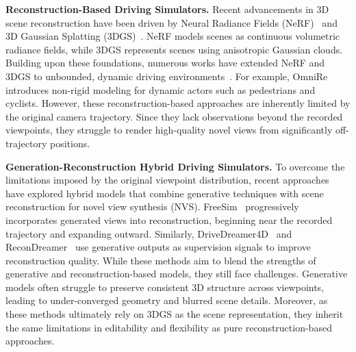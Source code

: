 
 

\textbf{Reconstruction-Based Driving Simulators.}  
Recent advancements in 3D scene reconstruction have been driven by Neural Radiance Fields (NeRF)~\cite{mildenhall2020nerf} and 3D Gaussian Splatting (3DGS)~\cite{kerbl20233d}. NeRF models scenes as continuous volumetric radiance fields, while 3DGS represents scenes using anisotropic Gaussian clouds. Building upon these foundations, numerous works have extended NeRF and 3DGS to unbounded, dynamic driving environments~\cite{chen2023periodic,huang2024s3gaussian,wu2023mars,guo2023streetsurf,turki2023suds,yang2023unisim,tonderski2024neurad,zhou2024drivinggaussian,yan2024street}. For example, OmniRe~\cite{chen2025omnire} introduces non-rigid modeling for dynamic actors such as pedestrians and cyclists. However, these reconstruction-based approaches are inherently limited by the original camera trajectory. Since they lack observations beyond the recorded viewpoints, they struggle to render high-quality novel views from significantly off-trajectory positions.

\textbf{Generation-Reconstruction Hybrid Driving Simulators.}  
To overcome the limitations imposed by the original viewpoint distribution, recent approaches have explored hybrid models that combine generative techniques with scene reconstruction for novel view synthesis (NVS). FreeSim~\cite{fan2024freesim} progressively incorporates generated views into reconstruction, beginning near the recorded trajectory and expanding outward. Similarly, DriveDreamer4D~\cite{zhao2024drive} and ReconDreamer~\cite{Ni2024ReconDreamerCW} use generative outputs as supervision signals to improve reconstruction quality. While these methods aim to blend the strengths of generative and reconstruction-based models, they still face challenges. Generative models often struggle to preserve consistent 3D structure across viewpoints, leading to under-converged geometry and blurred scene details. Moreover, as these methods ultimately rely on 3DGS as the scene representation, they inherit the same limitations in editability and flexibility as pure reconstruction-based approaches.

